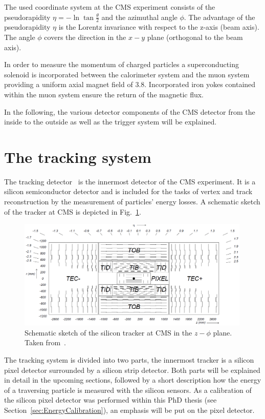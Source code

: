 The used coordinate system at the CMS experiment consists of the pseudorapidity $\eta = -\ln \tan{\frac{\theta}{2}}$ and the azimuthal angle $\phi$.
The advantage of the pseudorapidity $\eta$ is the Lorentz invariance with respect to the z-axis (beam axis).
The angle $\phi$ covers the direction in the $x-y$ plane (orthogonal to the beam axis).

In order to measure the momentum of charged particles a superconducting solenoid is incorporated between the calorimeter system and the muon system providing a uniform axial magnet field of 3.8\tesla.
Incorporated iron yokes contained within the muon system ensure the return of the magnetic flux. 

In the following, the various detector components of the CMS detector from the inside to the outside as well as the trigger system will be explained.
\FloatBarrier
\section{The tracking system}
The tracking detector~\cite{bib:CMS:Tracker_1997,bib:CMS:Tracker_2000} is the innermost detector of the CMS experiment. 
It is a silicon semiconductor detector and is included for the tasks of vertex and track reconstruction by the measurement of particles' energy losses.
A schematic sketch of the tracker at CMS is depicted in Fig.~\ref{fig:Tracker}.
\begin{figure}[!b]
  \centering
      \includegraphics[width=0.99\textwidth]{figures/experiment/CMS/Figures_Experimental_Apparatus_Tracker.png}
  \caption{Schematic sketch of the silicon tracker at CMS in the $z - \phi$ plane. Taken from~\cite{bib:CMS:tracking_8TeV}.}  
  \label{fig:Tracker}
\end{figure}
The tracking system is divided into two parts, the innermost tracker is a silicon pixel detector surrounded by a silicon strip detector.
Both parts will be explained in detail in the upcoming sections, followed by a short description how the energy of a traversing particle is measured with the silicon sensors.
As a calibration of the silicon pixel detector was performed within this PhD thesis (see Section~\ref{sec:EnergyCalibration}), an emphasis will be put on the pixel detector.



